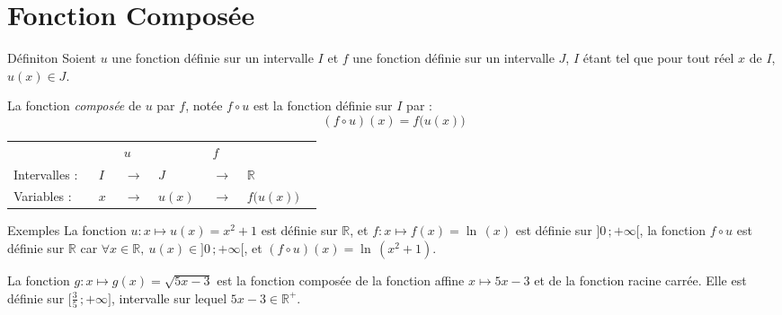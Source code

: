 \documentclass{coursbook}
\begin{document}
    \chapter{Fonction Composée}

    \begin{Gpartie}{Définiton} 
        Soient $u$ une fonction définie sur un intervalle $I$ et $f$ une fonction définie sur un intervalle $J$, $I$ étant tel que pour tout réel $x$ de $I$, $u(x)\in J$.

        La fonction \emph{composée} de $u$ par $f$, notée $f\circ u$ est la fonction définie sur $I$ par :
        \[\boxed{(f\circ u)(x)=f\big(u(x)\big)}\]

        \begin{center}\begin{tabular}{ p{0.15\linewidth} *{2}{M{0.05\linewidth} M{0.025\linewidth} } M{0.1\linewidth} }
            & $u$           &       & $f$           &                   \\
            Intervalles :& $I$   & $\rightarrow$ & $J$   & $\rightarrow$ & $\mathbb{R}$      \\
            Variables :  & $x$   & $\rightarrow$ & $u(x)$& $\rightarrow$ & $f\big(u(x)\big)$ \\
        \end{tabular}\end{center}
        \parbox{\linewidth}{}
        \begin{Spartie}{Exemples} 
            La fonction $u:x\mapsto u(x)=x^2+1$ est définie sur $\mathbb{R}$, et $f:x\mapsto f(x)=\ln\,(x)$ est définie sur $\big]0\,;+\infty\big[$, la fonction $f\circ u$ est définie sur $\mathbb{R}$ car $\forall x\in\mathbb{R},~u(x)\in\big]0\,;+\infty\big[$, et $(f\circ u)(x)=\ln\,\left(x^2+1\right)$.

            La fonction $g:x\mapsto g(x)=\sqrt{5x-3}$ est la fonction composée de la fonction affine $x\mapsto 5x-3$ et de la fonction racine carrée. Elle est définie sur $\Big[\frac{3}{5}\,;+\infty\Big]$, intervalle sur lequel $5x-3\in\mathbb{R^{+}}$.
        \end{Spartie}
    \end{Gpartie}
    \vfill
    \pagebreak
\end{document}
